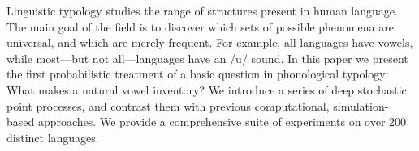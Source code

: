 Linguistic typology studies the range of structures present in human language. The main goal of the field is to discover which sets of possible phenomena are universal, and which are merely frequent. For example, all languages have vowels, while most---but not all---languages have an /u/ sound. In this paper we present the first probabilistic treatment of a basic question in phonological typology: What makes a natural vowel inventory?  We introduce a series of deep stochastic point processes, and contrast them with previous computational, simulation-based approaches.  We provide a comprehensive suite of experiments on over 200 distinct languages.
